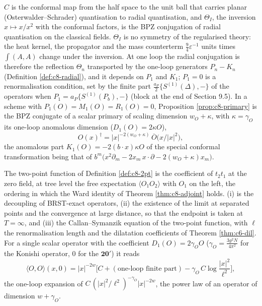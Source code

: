 \begin{remark}
$C$ is the conformal map from the half space to the unit ball that carries planar (Osterwalder--Schrader) quantisation to radial quantisation, and $\Theta_I$, the inversion $x\mapsto x/x^2$ with the conformal factors, is the BPZ conjugation of radial quantisation on the classical fields. $\Theta_I$ is no symmetry of the regularised theory: the heat kernel, the propagator and the mass counterterm $\tfrac94\varepsilon^{-1}$ units times $\int(A,A)$ change under the inversion. At one loop the radial conjugation is therefore the reflection $\Theta_n$ transported by the one-loop generators $P_n-K_n$ (Definition \ref{def:c8-radial}), and it depends on $P_1$ and $K_1$; $P_1=0$ is a renormalisation condition, set by the finite part $\tfrac{a_P}2\{S^{(1)}(\Delta),-\}$ of the operators when $P_1=a_P\{S^{(1)}(P_b),-\}$ (block at the end of Section 9.5). In a scheme with $P_1(O)=M_1(O)=R_1(O)=0$, Proposition \ref{prop:c8-primary} is the BPZ conjugate of a scalar primary of scaling dimension $w_O+\kappa$, with $\kappa=\gamma_O$ its one-loop anomalous dimension ($D_1(O)=2\kappa O$),
\[
O(x)^\dagger=|x|^{-2(w_O+\kappa)}\,\overline O\big(x/|x|^2\big),
\]
the anomalous part $K_1(O)=-2(b\cdot x)\kappa O$ of the special conformal transformation being that of $b^m\big(x^2\partial_m-2x_m\,x\cdot\partial-2(w_O+\kappa)x_m\big)$.
\end{remark}

\begin{remark}
The two-point function of Definition \ref{def:c8-2pt} is the coefficient of $t_2t_1$ at the zero field, at tree level the free expectation $\langle O_1O_2\rangle$ with $O_1$ on the left, the ordering in which the Ward identity of Theorem \ref{thm:c8-adjoint} holds. (i) is the decoupling of BRST-exact operators, (ii) the existence of the limit at separated points and the convergence at large distance, so that the endpoint is taken at $T=\infty$, and (iii) the Callan--Symanzik equation of the two-point function, with $\ell$ the renormalisation length and the dilatation coefficients of Theorem \ref{thm:c6-dil}. For a single scalar operator with the coefficient $D_1(O)=2\gamma_OO$ ($\gamma_O=\frac{3g^2N}{4\pi^2}$ for the Konishi operator, $0$ for the $\mathbf{20'}$) it reads
\[
\langle O,O\rangle(x,0)=|x|^{-2w}\Big[C+(\text{one-loop finite part})-\gamma_O\,C\log\frac{|x|^2}{\ell^2}\Big],
\]
the one-loop expansion of $C\,(|x|^2/\ell^2)^{-\gamma_O}|x|^{-2w}$, the power law of an operator of dimension $w+\gamma_O$.
\end{remark}

